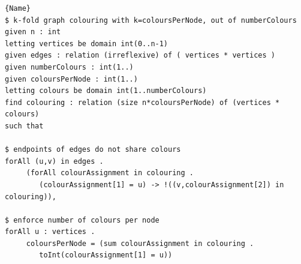 \documentclass[a4paper,UKenglish,cleveref,pdfa]{lipics-v2021}
\newcommand{\zap}[1]{}
\newcommand{\essence}{\textsc{Essence}\xspace}
\begin{document}
\zap{
\begin{itemize}
\end{itemize}
}

\begin{lstlisting}[caption={\essence specification of $k$-fold graph colouring, a variant in which each node in a given graph must be assigned $k$ colours with no pair of nodes connected by an edge sharing a colour.},label={lst:before},frame=tlrb]{Name}
$ k-fold graph colouring with k=coloursPerNode, out of numberColours
given n : int
letting vertices be domain int(0..n-1)
given edges : relation (irreflexive) of ( vertices * vertices )
given numberColours : int(1..)
given coloursPerNode : int(1..)
letting colours be domain int(1..numberColours)
find colouring : relation (size n*coloursPerNode) of (vertices * colours)
such that

$ endpoints of edges do not share colours
forAll (u,v) in edges .
     (forAll colourAssignment in colouring .
        (colourAssignment[1] = u) -> !((v,colourAssignment[2]) in colouring)),

$ enforce number of colours per node
forAll u : vertices .
     coloursPerNode = (sum colourAssignment in colouring .
        toInt(colourAssignment[1] = u))
        
\end{lstlisting}
\end{document}
